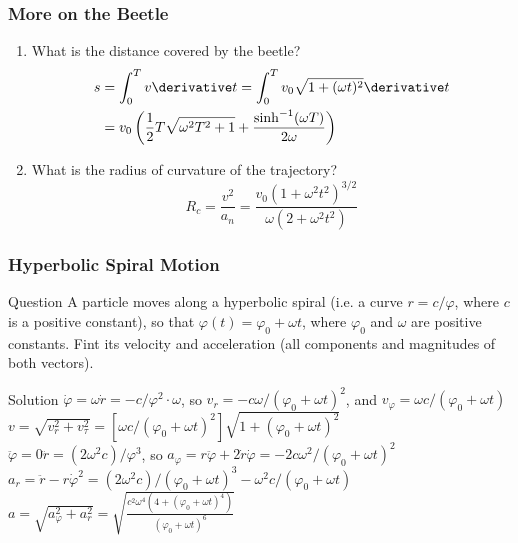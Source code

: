 \begin{frame}
\frametitle{More on the Beetle}
\begin{enumerate}
\item{What is the \alert{distance} covered by the beetle?\begin{align*}s&=\int_0^T v\derivative t=\int_0^T v_0\sqrt{1+(\omega t)^2}\derivative t\\&=v_0 \left(\frac{1}{2} T \sqrt{\omega^2 T^2+1}+\frac{\sinh ^{-1}(\omega T)}{2 \omega}\right)\end{align*}}
\item{What is the \alert{radius of curvature} of the trajectory?\[R_c=\frac{v^2}{a_n}=\frac{v_0(1+\omega^2 t^2)^{3/2}}{\omega(2+\omega^2 t^2)}\]}
\end{enumerate}
\end{frame}
\begin{frame}
\frametitle{Hyperbolic Spiral Motion}
\begin{block}{Question}
A particle moves along a \alert{hyperbolic spiral} (i.e. a curve $r=c/\varphi$, where $c$ is a positive constant), so that $\varphi (t)=\varphi_0+\omega t$, where $\varphi_0$ and $\omega$ are positive constants. Fint its \alert{velocity} and \alert{acceleration} (all components and magnitudes of both vectors).
\end{block}
\begin{block}{Solution}
$\dot\varphi=\omega$\quad$\dot r=-c/\varphi^2\cdot\omega$, so $v_r=-c\omega/(\varphi_0+\omega t)^2$, and $v_\varphi=\omega c/(\varphi_0+\omega t)$\\$v=\sqrt{v_r^2+v_\tau^2}=[\omega c/(\varphi_0+\omega t)^2]\sqrt{1+(\varphi_0+\omega t)^2}$\\
$\ddot\varphi=0$\quad$\ddot r=(2\omega^2 c)/\varphi^3$, so $a_\varphi=r\ddot\varphi+2\dot r\dot \varphi=-2c\omega^2/(\varphi_0+\omega t)^2$\\
$a_r=\ddot r-r\dot{\varphi}^{2}=(2\omega^2 c)/(\varphi_0+\omega t)^3-\omega^2 c/(\varphi_0+\omega t)$\\
$a=\sqrt{a_\varphi^2+a_r^2}=\sqrt{\frac{c^2\omega^4(4+(\varphi_0+\omega t)^4)}{(\varphi_0+\omega t)^6}}$
\end{block}
\end{frame}
